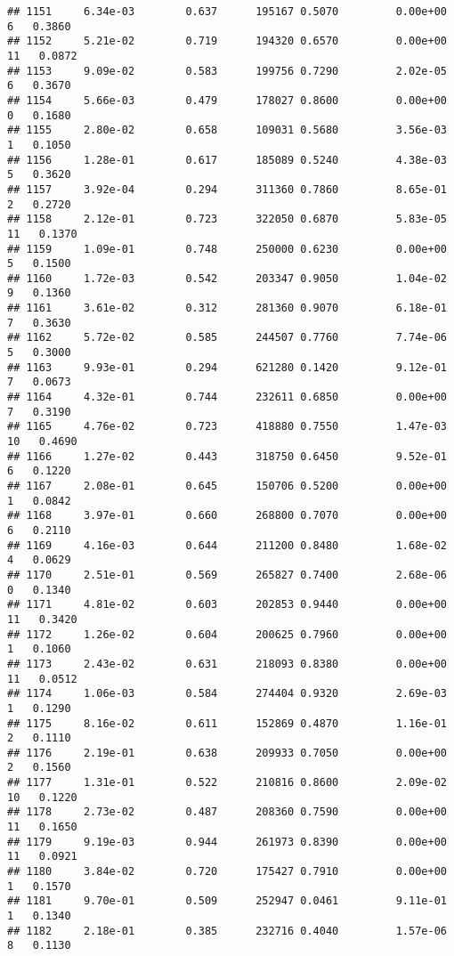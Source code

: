 \documentclass[
]{article}
\begin{document}
\begin{verbatim}
## 1151     6.34e-03        0.637      195167 0.5070         0.00e+00   6   0.3860
## 1152     5.21e-02        0.719      194320 0.6570         0.00e+00  11   0.0872
## 1153     9.09e-02        0.583      199756 0.7290         2.02e-05   6   0.3670
## 1154     5.66e-03        0.479      178027 0.8600         0.00e+00   0   0.1680
## 1155     2.80e-02        0.658      109031 0.5680         3.56e-03   1   0.1050
## 1156     1.28e-01        0.617      185089 0.5240         4.38e-03   5   0.3620
## 1157     3.92e-04        0.294      311360 0.7860         8.65e-01   2   0.2720
## 1158     2.12e-01        0.723      322050 0.6870         5.83e-05  11   0.1370
## 1159     1.09e-01        0.748      250000 0.6230         0.00e+00   5   0.1500
## 1160     1.72e-03        0.542      203347 0.9050         1.04e-02   9   0.1360
## 1161     3.61e-02        0.312      281360 0.9070         6.18e-01   7   0.3630
## 1162     5.72e-02        0.585      244507 0.7760         7.74e-06   5   0.3000
## 1163     9.93e-01        0.294      621280 0.1420         9.12e-01   7   0.0673
## 1164     4.32e-01        0.744      232611 0.6850         0.00e+00   7   0.3190
## 1165     4.76e-02        0.723      418880 0.7550         1.47e-03  10   0.4690
## 1166     1.27e-02        0.443      318750 0.6450         9.52e-01   6   0.1220
## 1167     2.08e-01        0.645      150706 0.5200         0.00e+00   1   0.0842
## 1168     3.97e-01        0.660      268800 0.7070         0.00e+00   6   0.2110
## 1169     4.16e-03        0.644      211200 0.8480         1.68e-02   4   0.0629
## 1170     2.51e-01        0.569      265827 0.7400         2.68e-06   0   0.1340
## 1171     4.81e-02        0.603      202853 0.9440         0.00e+00  11   0.3420
## 1172     1.26e-02        0.604      200625 0.7960         0.00e+00   1   0.1060
## 1173     2.43e-02        0.631      218093 0.8380         0.00e+00  11   0.0512
## 1174     1.06e-03        0.584      274404 0.9320         2.69e-03   1   0.1290
## 1175     8.16e-02        0.611      152869 0.4870         1.16e-01   2   0.1110
## 1176     2.19e-01        0.638      209933 0.7050         0.00e+00   2   0.1560
## 1177     1.31e-01        0.522      210816 0.8600         2.09e-02  10   0.1220
## 1178     2.73e-02        0.487      208360 0.7590         0.00e+00  11   0.1650
## 1179     9.19e-03        0.944      261973 0.8390         0.00e+00  11   0.0921
## 1180     3.84e-02        0.720      175427 0.7910         0.00e+00   1   0.1570
## 1181     9.70e-01        0.509      252947 0.0461         9.11e-01   1   0.1340
## 1182     2.18e-01        0.385      232716 0.4040         1.57e-06   8   0.1130

\end{verbatim}
\end{document}
